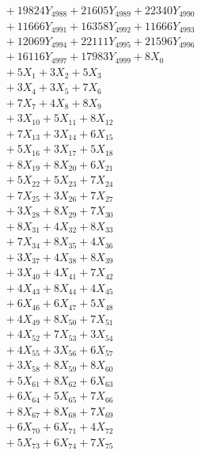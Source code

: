 \documentclass[a4paper,10pt]{article}
\begin{document}
{\begin{align}
&\;  + 19824 Y_{4988} + 21605 Y_{4989} + 22340 Y_{4990} \\[0.3ex]
&\;  + 11666 Y_{4991} + 16358 Y_{4992} + 11666 Y_{4993} \\[0.3ex]
&\;  + 12069 Y_{4994} + 22111 Y_{4995} + 21596 Y_{4996} \\[0.3ex]
&\;  + 16116 Y_{4997} + 17983 Y_{4999} + 8 X_{0} \\[0.3ex]
&\;  + 5 X_{1} + 3 X_{2} + 5 X_{3} \\[0.3ex]
&\;  + 3 X_{4} + 3 X_{5} + 7 X_{6} \\[0.3ex]
&\;  + 7 X_{7} + 4 X_{8} + 8 X_{9} \\[0.5ex]\allowbreak
&\;  + 3 X_{10} + 5 X_{11} + 8 X_{12} \\[0.3ex]
&\;  + 7 X_{13} + 3 X_{14} + 6 X_{15} \\[0.3ex]
&\;  + 5 X_{16} + 3 X_{17} + 5 X_{18} \\[0.3ex]
&\;  + 8 X_{19} + 8 X_{20} + 6 X_{21} \\[0.3ex]
&\;  + 5 X_{22} + 5 X_{23} + 7 X_{24} \\[0.3ex]
&\;  + 7 X_{25} + 3 X_{26} + 7 X_{27} \\[0.3ex]
&\;  + 3 X_{28} + 8 X_{29} + 7 X_{30} \\[0.3ex]
&\;  + 8 X_{31} + 4 X_{32} + 8 X_{33} \\[0.3ex]
&\;  + 7 X_{34} + 8 X_{35} + 4 X_{36} \\[0.3ex]
&\;  + 3 X_{37} + 4 X_{38} + 8 X_{39} \\[0.5ex]\allowbreak
&\;  + 3 X_{40} + 4 X_{41} + 7 X_{42} \\[0.3ex]
&\;  + 4 X_{43} + 8 X_{44} + 4 X_{45} \\[0.3ex]
&\;  + 6 X_{46} + 6 X_{47} + 5 X_{48} \\[0.3ex]
&\;  + 4 X_{49} + 8 X_{50} + 7 X_{51} \\[0.3ex]
&\;  + 4 X_{52} + 7 X_{53} + 3 X_{54} \\[0.3ex]
&\;  + 4 X_{55} + 3 X_{56} + 6 X_{57} \\[0.3ex]
&\;  + 3 X_{58} + 8 X_{59} + 8 X_{60} \\[0.3ex]
&\;  + 5 X_{61} + 8 X_{62} + 6 X_{63} \\[0.3ex]
&\;  + 6 X_{64} + 5 X_{65} + 7 X_{66} \\[0.3ex]
&\;  + 8 X_{67} + 8 X_{68} + 7 X_{69} \\[0.5ex]\allowbreak
&\;  + 6 X_{70} + 6 X_{71} + 4 X_{72} \\[0.3ex]
&\;  + 5 X_{73} + 6 X_{74} + 7 X_{75} \\[0.3ex]

\end{align}}
\end{document}
